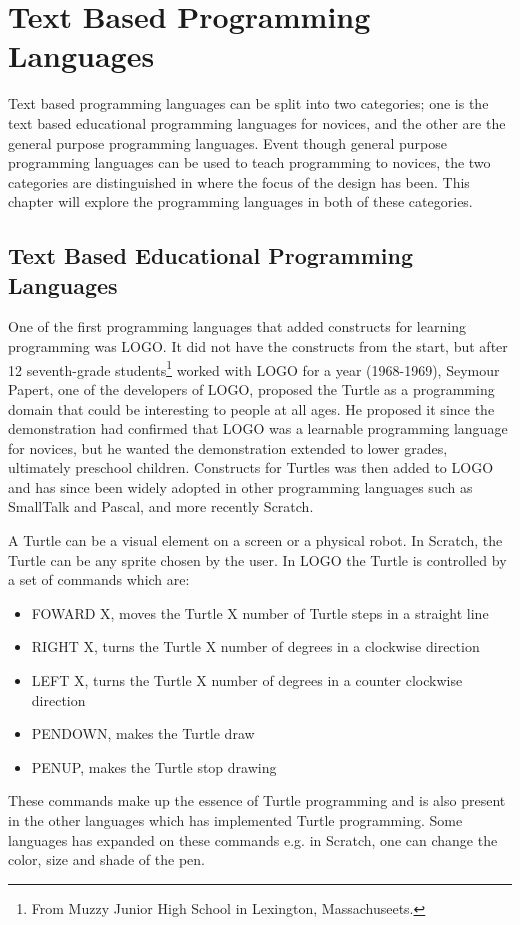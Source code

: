 \chapter{Text Based Programming Languages}
\label{chap:text_based_programming_languages}
Text based programming languages can be split into two categories; one is the text based educational programming languages for novices, and the other are the general purpose programming languages. Event though general purpose programming languages can be used to teach programming to novices, the two categories are distinguished in where the focus of the design has been. This chapter will explore the programming languages in both of these categories.

\section{Text Based Educational Programming Languages}
One of the first programming languages that added constructs for learning programming was LOGO. It did not have the constructs from the start, but after 12 seventh-grade students\footnote{From Muzzy Junior High School in Lexington, Massachuseets.} worked with LOGO for a year (1968-1969), Seymour Papert, one of the developers of LOGO, proposed the Turtle as a programming domain that could be interesting to people at all ages. He proposed it since the demonstration had confirmed that LOGO was a learnable programming language for novices, but he wanted the demonstration extended to lower grades, ultimately preschool children. Constructs for Turtles was then added to LOGO and has since been widely adopted in other programming languages such as SmallTalk and Pascal, and more recently Scratch.

A Turtle can be a visual element on a screen or a physical robot. In Scratch, the Turtle can be any sprite chosen by the user. In LOGO the Turtle is controlled by a set of commands which are:
\begin{itemize}
\item FOWARD X, moves the Turtle X number of Turtle steps in a straight line
\item RIGHT X, turns the Turtle X number of degrees in a clockwise direction
\item LEFT X, turns the Turtle X number of degrees in a counter clockwise direction
\item PENDOWN, makes the Turtle draw
\item PENUP, makes the Turtle stop drawing
\end{itemize}
These commands make up the essence of Turtle programming and is also present in the other languages which has implemented Turtle programming. Some languages has expanded on these commands e.g. in Scratch, one can change the color, size and shade of the pen.

